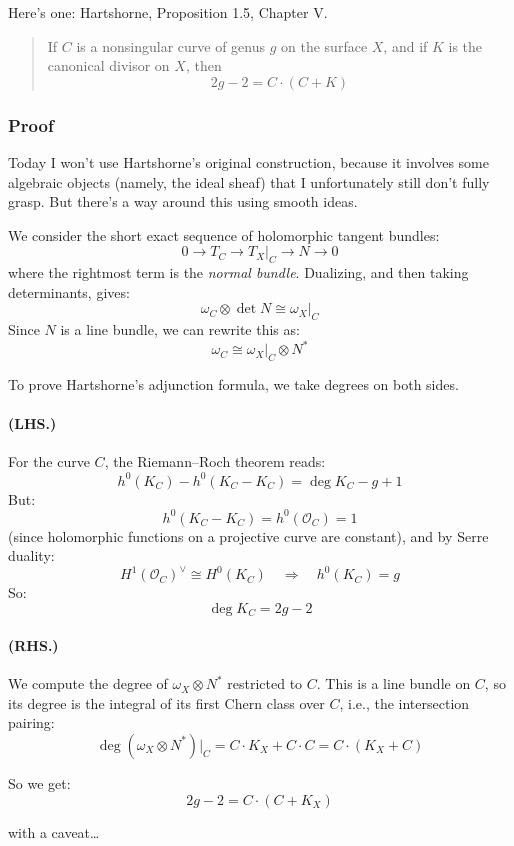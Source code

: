 Here’s one: Hartshorne, Proposition 1.5, Chapter V.

\begin{quote}
If \( C \) is a nonsingular curve of genus \( g \) on the surface \( X \), and if \( K \) is the canonical divisor on \( X \), then
\[
2g - 2 = C \cdot (C + K)
\]
\end{quote}

\subsubsection*{Proof}

Today I won’t use Hartshorne’s original construction, because it involves some algebraic objects (namely, the ideal sheaf) that I unfortunately still don’t fully grasp. But there’s a way around this using smooth ideas.

We consider the short exact sequence of holomorphic tangent bundles:
\[
0 \to T_C \to T_X|_C \to N \to 0
\]
where the rightmost term is the \emph{normal bundle}. Dualizing, and then taking determinants, gives:
\[
\omega_C \otimes \det N \cong \omega_X|_C
\]
Since \( N \) is a line bundle, we can rewrite this as:
\[
\omega_C \cong \omega_X|_C \otimes N^*
\]

To prove Hartshorne’s adjunction formula, we take degrees on both sides.

\paragraph{(LHS.)} For the curve \( C \), the Riemann–Roch theorem reads:
\[
h^0(K_C) - h^0(K_C - K_C) = \deg K_C - g + 1
\]
But:
\[
h^0(K_C - K_C) = h^0(\mathcal{O}_C) = 1
\]
(since holomorphic functions on a projective curve are constant), and by Serre duality:
\[
H^1(\mathcal{O}_C)^\vee \cong H^0(K_C)
\quad \Rightarrow \quad
h^0(K_C) = g
\]
So:
\[
\deg K_C = 2g - 2
\]

\paragraph{(RHS.)} We compute the degree of \( \omega_X \otimes N^* \) restricted to \( C \). This is a line bundle on \( C \), so its degree is the integral of its first Chern class over \( C \), i.e., the intersection pairing:
\[
\deg (\omega_X \otimes N^*)|_C = C \cdot K_X + C \cdot C
= C \cdot (K_X + C)
\]

So we get:
\[
2g - 2 = C \cdot (C + K_X)
\]

with a caveat…

